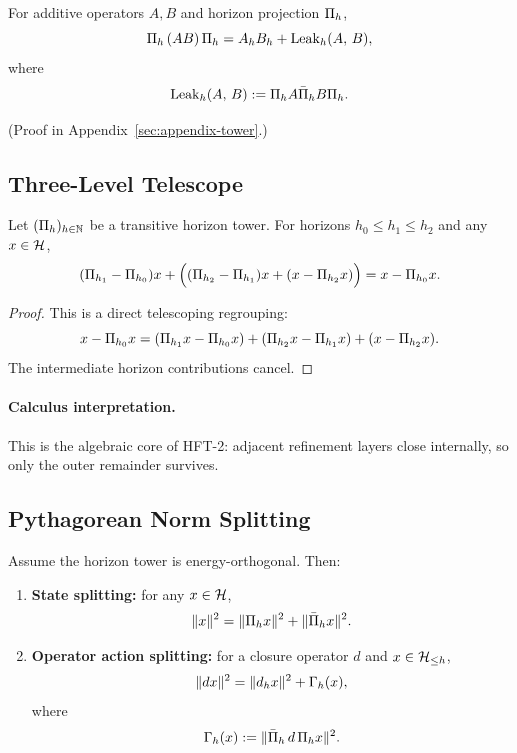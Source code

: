 \begin{lemma}
\label{lem:block-splitting}
For additive operators $A, B$ and horizon projection $\Pi_{h}$,
\[
\Pi_{h}\, (AB) \,\Pi_{h} = A_{h}B_{h} + \mathrm{Leak}_{h}(A,\, B),
\]
where
\[
\mathrm{Leak}_{h}(A,\, B) := \Pi_{h} A \bar{\Pi}_{h} B \Pi_{h}.
\]
\end{lemma}

(Proof in Appendix~\ref{sec:appendix-tower}.)

\subsection{Three-Level Telescope}
\label{subsec:telescoping-lemma}

\begin{lemma}
\label{lem:orthogonal-telescoping}
Let $(\Pi_{h})_{h \in \mathbb{N}}$ be a transitive horizon tower.
For horizons $h_0 \le h_1 \le h_2$ and any $x \in \mathcal{H}$,
\[
(\Pi_{h_1} - \Pi_{h_0})x
+
\Bigl((\Pi_{h_2} - \Pi_{h_1})x + (x - \Pi_{h_2}x)\Bigr)
=
x - \Pi_{h_0}x.
\]
\end{lemma}

\begin{proof}
This is a direct telescoping regrouping:
\[
x - \Pi_{h_0}x
=
(\Pi_{h_1}x - \Pi_{h_0}x) + (\Pi_{h_2}x - \Pi_{h_1}x) + (x - \Pi_{h_2}x).
\]
The intermediate horizon contributions cancel.
\end{proof}

\paragraph{Calculus interpretation.}
This is the algebraic core of HFT-2: adjacent refinement layers close
internally, so only the outer remainder survives.

\subsection{Pythagorean Norm Splitting}
\label{subsec:pythagorean-norm}

\begin{lemma}
\label{lem:pythagorean-splitting}
Assume the horizon tower is energy-orthogonal.
Then:
\begin{enumerate}[label=(\roman*)]
\item \textbf{State splitting:} for any $x \in \mathcal{H}$,
\[
\|x\|^2 = \|\Pi_{h} x\|^2 + \|\bar{\Pi}_{h} x\|^2.
\]
\item \textbf{Operator action splitting:} for a closure operator $d$ and $x \in \mathcal{H}_{\le h}$,
\[
\|dx\|^2 = \|d_{h} x\|^2 + \Gamma_{h}(x),
\]
where
\[
\Gamma_{h}(x) := \|\bar{\Pi}_{h}\, d \,\Pi_{h}x\|^2.
\]
\end{enumerate}
\end{lemma}

